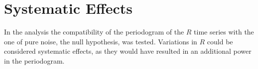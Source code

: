 






\section{Systematic Effects}
In the analysis the compatibility of the periodogram of the $R$ time series with the one of pure noise, the null hypothesis, was tested. Variations in $R$ could be considered systematic effects, as they would have resulted in an additional power in the periodogram.

